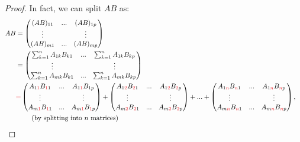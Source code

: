 \begin{proof}
In fact, we can split \(AB\) as:
\begin{align*}
    AB & = \begin{pmatrix}
                (AB)_{11} & ... & (AB)_{1p} \\
                \vdots    &     & \vdots \\
                (AB)_{m1} & ... & (AB)_{mp} \\
            \end{pmatrix} & \\
       & = \begin{pmatrix}
                \sum_{k = 1}^n A_{1k} B_{k1} & ... & \sum_{k = 1}^n A_{1k} B_{kp} \\
                \vdots    &     & \vdots \\
                \sum_{k = 1}^n A_{mk} B_{k1} & ... & \sum_{k = 1}^n A_{mk} B_{kp} \\
            \end{pmatrix} & \\
        & \RED{=} \begin{pmatrix}
                A_{1\RED{1}} B_{\RED{1}1} & ... & A_{1\RED{1}} B_{1p} \\
                \vdots    &     & \vdots \\
                A_{m\RED{1}} B_{\RED{1}1} & ... & A_{m\RED{1}} B_{\RED{1}p} \\
            \end{pmatrix}
            + \begin{pmatrix}
                A_{1\RED{2}} B_{\RED{2}1} & ... & A_{1\RED{2}} B_{\RED{2}p} \\
                \vdots    &     & \vdots \\
                A_{m\RED{2}} B_{\RED{2}1} & ... & A_{m\RED{2}} B_{\RED{2}p} \\
            \end{pmatrix}
            + ... + \begin{pmatrix}
                A_{1\RED{n}} B_{\RED{n}1} & ... & A_{1\RED{n}} B_{\RED{n}p} \\
                \vdots    &     & \vdots \\
                A_{m\RED{n}} B_{\RED{n}1} & ... & A_{m\RED{n}} B_{\RED{n}p} \\
            \end{pmatrix}, \\
            & \text{\ \ \ \ \ \ \ (by splitting into \(n\) matrices)}
\end{align*}

\end{proof}
